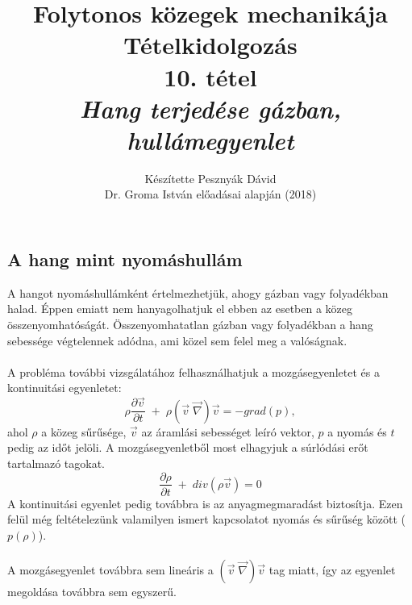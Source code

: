 \documentclass[a4paper, titlepage]{article}
\begin{document}
\begin{titlepage}
	\title{\textbf{Folytonos közegek mechanikája}\\
	Tételkidolgozás\\
	10. tétel\\
	\textit{Hang terjedése gázban, hullámegyenlet}}
	\author{Készítette Pesznyák Dávid\\
	Dr. Groma István előadásai alapján (2018)}
	\date{}
\end{titlepage}
\maketitle
\newpage
\subsection*{A hang mint nyomáshullám}
A hangot nyomáshullámként értelmezhetjük, ahogy gázban vagy folyadékban halad. Éppen emiatt nem hanyagolhatjuk el ebben az esetben a közeg összenyomhatóságát. Összenyomhatatlan gázban vagy folyadékban a hang sebessége végtelennek adódna, ami közel sem felel meg a valóságnak.\\\\
A probléma további vizsgálatához felhasználhatjuk a mozgásegyenletet és a kontinuitási egyenletet:
\begin{equation}
\rho\frac{\partial \vec{v}}{\partial t}\;+\;\rho(\vec{v}\;\vec{\nabla})\vec{v}=-grad(p),
\end{equation}
ahol $\rho$ a közeg sűrűsége, $\vec{v}$ az áramlási sebességet leíró vektor, $p$ a nyomás és $t$ pedig az időt jelöli. A mozgásegyenletből most elhagyjuk a súrlódási erőt tartalmazó tagokat.
\begin{equation}
\frac{\partial \rho}{\partial t}\;+\;div(\rho \vec{v})=0
\end{equation}
A kontinuitási egyenlet pedig továbbra is az anyagmegmaradást biztosítja. Ezen felül még feltételezünk valamilyen ismert kapcsolatot nyomás és sűrűség között ($p(\rho)$).\\\\
A mozgásegyenlet továbbra sem lineáris a $(\vec{v}\;\vec{\nabla})\vec{v}$ tag miatt, így az egyenlet megoldása továbbra sem egyszerű.
\end{document}
